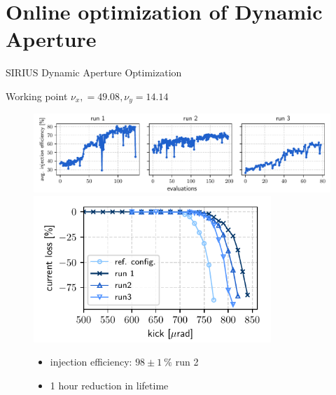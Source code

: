\documentclass[aspectratio=169]{beamer}
\begin{document}
\section{Online optimization of Dynamic Aperture}
\begin{frame}{SIRIUS Dynamic Aperture Optimization}
    \begin{minipage}{0.55\textwidth}
        Working point $\nu_x, = 49.08, \nu_y = 14.14$
        \begin{figure}
            \centering
            \includegraphics[width=\textwidth]{oldtunes_history.pdf}
            \includegraphics[width = 0.8\textwidth]{WEPL087_f1.pdf}
            \vfill
            \begin{itemize}
                \item injection efficiency: $98\pm1~\%$ run 2
                \item 1 hour reduction in lifetime
            \end{itemize}
        \end{figure}
    \end{minipage}
    \hfill
    \begin{minipage}{0.44\textwidth}
        \begin{figure}
            \centering

\end{figure}
\end{minipage}
\end{frame}
\end{document}
